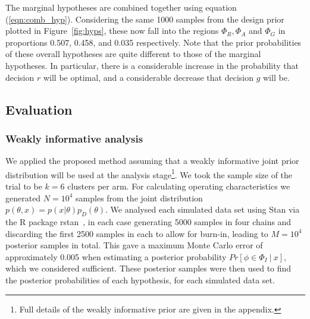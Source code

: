 \documentclass[AMA,STIX1COL]{WileyNJD-v2}
\begin{document}
The marginal hypotheses are combined together using equation (\ref{eqn:comb_hyp}). Considering the same 1000 samples from the design prior plotted in Figure~\ref{fig:hyps}, these now fall into the regions $\Phi_R, \Phi_A$ and $\Phi_G$ in proportions 0.507, 0.458, and 0.035 respectively. Note that the prior probabilities of these overall hypotheses are quite different to those of the marginal hypotheses. In particular, there is a considerable increase in the probability that decision $r$ will be optimal, and a considerable decrease that decision $g$ will be. 
\subsection{Evaluation}

\subsubsection{Weakly informative analysis}

We applied the proposed method assuming that a weakly informative joint prior distribution will be used at the analysis stage\footnote{Full details of the weakly informative prior are given in the appendix.}. We took the sample size of the trial to be $k = 6$ clusters per arm. For calculating operating characteristics we generated $N = 10^4$ samples from the joint distribution $p(\theta, x) = p(x | \theta)p_D(\theta)$. We analysed each simulated data set using Stan via the R package rstan~\cite{rstan}, in each case generating 5000 samples in four chains and discarding the first 2500 samples in each to allow for burn-in, leading to $M = 10^4$ posterior samples in total. This gave a maximum Monte Carlo error of approximately 0.005 when estimating a posterior probability $Pr[\phi \in \Phi_I ~|~ x]$, which we considered sufficient. These posterior samples were then used to find the posterior probabilities of each hypothesis, for each simulated data set.

\end{document}
